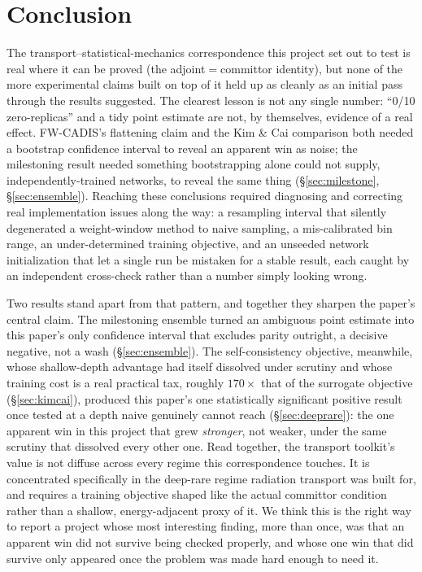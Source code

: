 \documentclass[11pt]{article}
\begin{document}
	\section{Conclusion}
	The transport--statistical-mechanics correspondence this project set out to test is real
	where it can be proved (the adjoint$=$committor identity), but none of the more
	experimental claims built on top of it held up as cleanly as an initial pass through the
	results suggested. The clearest lesson is not any single number: ``0/10 zero-replicas''
	and a tidy point estimate are not, by themselves, evidence of a real effect. FW-CADIS's
	flattening claim and the Kim \& Cai comparison both needed a bootstrap confidence interval
	to reveal an apparent win as noise; the milestoning result needed something bootstrapping
	alone could not supply, independently-trained networks, to reveal the same thing
	(\S\ref{sec:milestone}, \S\ref{sec:ensemble}). Reaching these conclusions required
	diagnosing and correcting real implementation issues along the way: a resampling
	interval that silently degenerated a weight-window method to naive sampling, a
	mis-calibrated bin range, an under-determined training objective, and an unseeded
	network initialization that let a single run be mistaken for a stable result, each
	caught by an independent cross-check rather than a number simply looking wrong.

	Two results stand apart from that pattern, and together they sharpen the paper's central
	claim. The milestoning ensemble turned an ambiguous point estimate into this paper's only
	confidence interval that excludes parity outright, a decisive negative, not a wash
	(\S\ref{sec:ensemble}). The self-consistency objective, meanwhile, whose shallow-depth
	advantage had itself dissolved under scrutiny and whose training cost is a real practical
	tax, roughly $170\times$ that of the surrogate objective (\S\ref{sec:kimcai}), produced this paper's
	one statistically significant positive result once tested at a depth naive genuinely
	cannot reach (\S\ref{sec:deeprare}): the one apparent win in this project that grew
	\emph{stronger}, not weaker, under the same scrutiny that dissolved every other one. Read
	together, the transport toolkit's value is not diffuse across every regime this
	correspondence touches. It is concentrated specifically in the deep-rare regime radiation
	transport was built for, and requires a training objective shaped like the actual
	committor condition rather than a shallow, energy-adjacent proxy of it. We think this is
	the right way to report a project whose most interesting finding, more than once, was
	that an apparent win did not survive being checked properly, and whose one win that did
	survive only appeared once the problem was made hard enough to need it.
	
\end{document}
